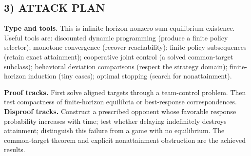 \documentclass[11pt,a4paper]{article}
\theoremstyle{definition}
\theoremstyle{remark}
\begin{document}
\subsection*{3) ATTACK PLAN}
\textbf{Type and tools.} This is infinite-horizon nonzero-sum equilibrium existence. Useful tools are: discounted dynamic programming (produce a finite policy selector); monotone convergence (recover reachability); finite-policy subsequences (retain exact attainment); cooperative joint control (a solved common-target subclass); behavioral deviation comparisons (respect the strategy domain); finite-horizon induction (tiny cases); optimal stopping (search for nonattainment).

\textbf{Proof tracks.} First solve aligned targets through a team-control problem. Then test compactness of finite-horizon equilibria or best-response correspondences. \textbf{Disproof tracks.} Construct a prescribed opponent whose favorable response probability increases with time; test whether delaying indefinitely destroys attainment; distinguish this failure from a game with no equilibrium. The common-target theorem and explicit nonattainment obstruction are the achieved results.
\end{document}
